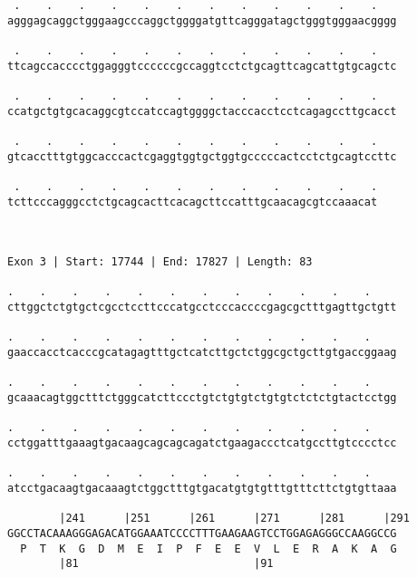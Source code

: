\documentclass{article}
\begin{document}
\begin{Verbatim}
 .    .    .    .    .    .    .    .    .    .    .    .   
agggagcaggctgggaagcccaggctggggatgttcagggatagctgggtgggaacgggg
                                                            
 .    .    .    .    .    .    .    .    .    .    .    .   
ttcagccacccctggagggtccccccgccaggtcctctgcagttcagcattgtgcagctc
                                                            
 .    .    .    .    .    .    .    .    .    .    .    .   
ccatgctgtgcacaggcgtccatccagtggggctacccacctcctcagagccttgcacct
                                                            
 .    .    .    .    .    .    .    .    .    .    .    .   
gtcacctttgtggcacccactcgaggtggtgctggtgcccccactcctctgcagtccttc
                                                            
 .    .    .    .    .    .    .    .    .    .    .    .
tcttcccagggcctctgcagcacttcacagcttccatttgcaacagcgtccaaacat
                                                         
                                                         
 
Exon 3 | Start: 17744 | End: 17827 | Length: 83
 
.    .    .    .    .    .    .    .    .    .    .    .    
cttggctctgtgctcgcctccttcccatgcctcccaccccgagcgctttgagttgctgtt
                                                            
.    .    .    .    .    .    .    .    .    .    .    .    
gaaccacctcacccgcatagagtttgctcatcttgctctggcgctgcttgtgaccggaag
                                                            
.    .    .    .    .    .    .    .    .    .    .    .    
gcaaacagtggctttctgggcatcttccctgtctgtgtctgtgtctctctgtactcctgg
                                                            
.    .    .    .    .    .    .    .    .    .    .    .    
cctggatttgaaagtgacaagcagcagcagatctgaagaccctcatgccttgtcccctcc
                                                            
.    .    .    .    .    .    .    .    .    .    .    .    
atcctgacaagtgacaaagtctggctttgtgacatgtgtgtttgtttcttctgtgttaaa
                                                            
        |241      |251      |261      |271      |281      |291
GGCCTACAAAGGGAGACATGGAAATCCCCTTTGAAGAAGTCCTGGAGAGGGCCAAGGCCG
  P  T  K  G  D  M  E  I  P  F  E  E  V  L  E  R  A  K  A  G
        |81                           |91                   
  

\end{Verbatim}
\end{document}
